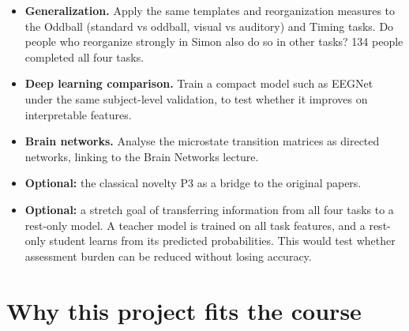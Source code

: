 \documentclass[11pt,a4paper]{article}
\begin{document}
\begin{itemize}
  \item \textbf{Generalization.} Apply the same templates and reorganization measures to the Oddball (standard vs oddball, visual vs auditory) and Timing tasks. Do people who reorganize strongly in Simon also do so in other tasks? 134 people completed all four tasks.
  \item \textbf{Deep learning comparison.} Train a compact model such as EEGNet~\cite{lawhern2018} under the same subject-level validation, to test whether it improves on interpretable features.
  \item \textbf{Brain networks.} Analyse the microstate transition matrices as directed networks, linking to the Brain Networks lecture.
  \item \textbf{Optional:} the classical novelty P3 as a bridge to the original papers.
  \item \textbf{Optional:} a stretch goal of transferring information from all four tasks to a rest-only model. A teacher model is trained on all task features, and a rest-only student learns from its predicted probabilities. This would test whether assessment burden can be reduced without losing accuracy.
\end{itemize}

\section{Why this project fits the course}
\end{document}
